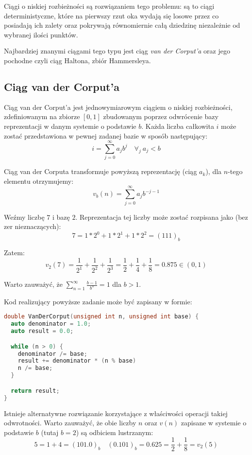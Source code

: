 \documentclass[../main.tex]{subfiles}
\begin{document}
Ciągi o niskiej rozbieżności są rozwiązaniem tego problemu: są to ciągi
deterministyczne, które na pierwszy rzut oka wydają się losowe przez co posiadają ich zalety oraz pokrywają równomiernie całą dziedzinę niezależnie od wybranej ilości punktów.

Najbardziej znanymi ciągami tego typu jest ciąg \textit{van der Corput'a} oraz jego pochodne czyli ciąg Haltona, zbiór Hammersleya.

\subsection{Ciąg van der Corput'a}

Ciąg van der Corput'a \cite{WongSamplingWH} jest jednowymiarowym ciągiem o
niskiej rozbieżności, zdefiniowanym na zbiorze $[0,1]$ zbudowanym poprzez
odwrócenie bazy reprezentacji w danym systemie o podstawie $b$. Każda liczba
całkowita $i$ może zostać przedstawiona w pewnej zadanej bazie w sposób
następujący:
\[ 
i = \sum_{j=0}^{\infty} {a_j b^j} \quad \forall_{j}\: a_j < b
\]

Ciąg van der Corputa transformuje powyższą reprezentację (ciąg $a_k$), dla $n$-tego elementu otrzymujemy:
\[ 
v_b(n) = \sum_{j=0}^{\infty} {a_j b^{-j-1}} 
\]

\begin{example}
  Weźmy liczbę $7$ i bazę $2$. Reprezentacja tej liczby może zostać rozpisana
  jako (bez zer nieznaczących):
  \[ 
  7 = 1 * 2^0 + 1 * 2^1 + 1 * 2^2 = (111)_{b} 
  \]

  \noindent Zatem:
  \[
    v_{2}(7)
      = \frac{1}{2^{1}} + \frac{1}{2^{2}} + \frac{1}{2^{3}}
      = \frac{1}{2} + \frac{1}{4} + \frac{1}{8}
      = 0.875
      \in (0,1)
  \]
\end{example}

Warto zauważyć, że $\sum_{n=1}^{\infty} \frac{b-1}{b^n} = 1$ dla $b>1$.

Kod realizujący powyższe zadanie może być zapisany w formie:

\begin{lstlisting}[language=c++]
double VanDerCorput(unsigned int n, unsigned int base) {
  auto denominator = 1.0;
  auto result = 0.0;

  while (n > 0) {
    denominator /= base;
    result += denominator * (n % base)
    n /= base;
  }

  return result;
}
\end{lstlisting}

Istnieje alternatywne rozwiązanie korzystające z właściwości operacji takiej
odwrotności. Warto zauważyć, że obie liczby $n$ oraz $v(n)$ zapisane w systemie o podstawie $b$ (tutaj $b=2$) są odbiciem lustrzanym:
\[
  5 = 1 + 4 = (101.0)_{b} \quad
  (0.101)_{b} = 0.625 = \frac{1}{2} + \frac{1}{8} = v_2(5)
\]
\end{document}
